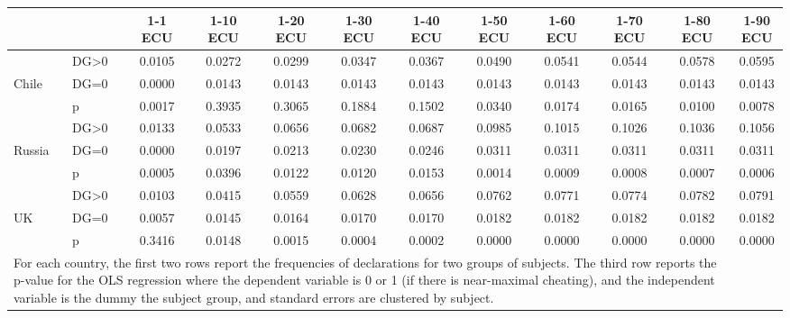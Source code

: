 \def\sym#1{\ifmmode^{#1}\else\(^{#1}\)\fi}
\begin{tabular}{|ll|cccccccccc|}
\hline\hline
&&1-1 ECU&1-10 ECU&1-20 ECU&1-30 ECU&1-40 ECU&1-50 ECU&1-60 ECU&1-70 ECU&1-80 ECU&1-90 ECU\\
\hline
&DG>0&   0.0105&   0.0272&   0.0299&   0.0347&   0.0367&   0.0490&   0.0541&   0.0544&   0.0578&   0.0595\\
Chile&DG=0&   0.0000&   0.0143&   0.0143&   0.0143&   0.0143&   0.0143&   0.0143&   0.0143&   0.0143&   0.0143\\
&p&   0.0017&   0.3935&   0.3065&   0.1884&   0.1502&   0.0340&   0.0174&   0.0165&   0.0100&   0.0078\\
\hline&DG>0&   0.0133&   0.0533&   0.0656&   0.0682&   0.0687&   0.0985&   0.1015&   0.1026&   0.1036&   0.1056\\
Russia&DG=0&   0.0000&   0.0197&   0.0213&   0.0230&   0.0246&   0.0311&   0.0311&   0.0311&   0.0311&   0.0311\\
&p&   0.0005&   0.0396&   0.0122&   0.0120&   0.0153&   0.0014&   0.0009&   0.0008&   0.0007&   0.0006\\
\hline&DG>0&   0.0103&   0.0415&   0.0559&   0.0628&   0.0656&   0.0762&   0.0771&   0.0774&   0.0782&   0.0791\\
UK&DG=0&   0.0057&   0.0145&   0.0164&   0.0170&   0.0170&   0.0182&   0.0182&   0.0182&   0.0182&   0.0182\\
&p&   0.3416&   0.0148&   0.0015&   0.0004&   0.0002&   0.0000&   0.0000&   0.0000&   0.0000&   0.0000\\
\hline\multicolumn{11}{p{15cm}}{\tiny For each country, the first two rows report the frequencies of declarations for two groups of subjects. The third row reports the p-value for the OLS regression where the dependent variable is 0 or 1 (if there is near-maximal cheating), and the independent variable is the dummy the subject group, and standard errors are clustered by subject. }\\
\end{tabular}